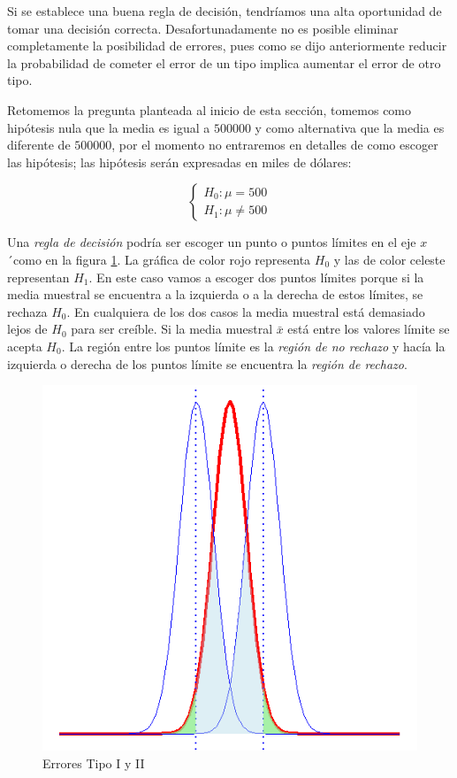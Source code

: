 \documentclass[]{book}
\begin{document}
Si se establece una buena regla de decisión, tendríamos una alta oportunidad de tomar una decisión correcta. Desafortunadamente no es posible eliminar completamente la posibilidad de errores, pues como se dijo anteriormente reducir la probabilidad de cometer el error de un tipo implica aumentar el error de otro tipo.

Retomemos la pregunta planteada al inicio de esta sección, tomemos como hipótesis nula que la media es igual a \(500000\) y como alternativa que la media es diferente de \(500000\), por el momento no entraremos en detalles de como escoger las hipótesis; las hipótesis serán expresadas en miles de dólares:

\begin{equation} 
\begin{cases} 
H_0: \mu = 500 \\ 
H_1: \mu \neq 500
\end{cases} 
\end{equation}

Una \emph{regla de decisión} podría ser escoger un punto o puntos límites en el eje \(x\)´como en la figura \ref{fig:pht}. La gráfica de color rojo representa \(H_0\) y las de color celeste representan \(H_1\). En este caso vamos a escoger dos puntos límites porque si la media muestral se encuentra a la izquierda o a la derecha de estos límites, se rechaza \(H_0\). En cualquiera de los dos casos la media muestral está demasiado lejos de \(H_0\) para ser creíble. Si la media muestral \(\bar{x}\) está entre los valores límite se acepta \(H_0\). La región entre los puntos límite es la \emph{región de no rechazo} y hacía la izquierda o derecha de los puntos límite se encuentra la \emph{región de rechazo}.

\begin{figure}[h]

{\centering \includegraphics[width=0.5\linewidth]{phtest} 

}

\caption{Errores Tipo I y II}\label{fig:pht}
\end{figure}
\end{document}
